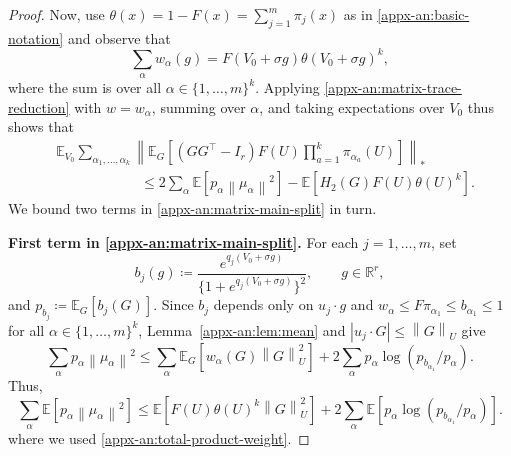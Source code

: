 \documentclass[11pt,letterpaper]{article}
\theoremstyle{remark}
\newcommand{\E}{\mathbb E}
\newcommand{\R}{\mathbb R}
\newcommand{\norm}[1]{\left\lVert#1\right\rVert}
\begin{document}
\begin{proof}
Now, use $\theta(x) = 1 - F(x) = \sum_{j=1}^m \pi_j(x)$ as in \eqref{appx-an:basic-notation} and observe that
\begin{equation}\label{appx-an:total-product-weight}
 \sum_\alpha w_\alpha(g)=F(V_0+\sigma g)\theta(V_0+\sigma g)^k,
\end{equation}
where the sum is over all $\alpha\in\{1,\dots,m\}^k$. Applying \eqref{appx-an:matrix-trace-reduction} with $w = w_{\alpha}$, summing over $\alpha$, and taking expectations over $V_0$ thus shows that
\begin{align}
& \E_{V_0}\sum_{\alpha_1,\ldots,\alpha_k}
 \left\|\E_G\left[(GG^\top-I_r)F(U)
              \prod_{a=1}^k\pi_{\alpha_a}(U)\right]\right\|_* \nonumber\\
& \qquad\qquad\qquad \le  2\sum_\alpha \E[p_\alpha\norm{\mu_\alpha}^2]
- \E[H_2(G)F(U)\theta(U)^k]. \label{appx-an:matrix-main-split}
\end{align}
We bound two terms in \eqref{appx-an:matrix-main-split} in turn.

{\bf First term in \eqref{appx-an:matrix-main-split}.} For each $j=1,\dots, m$, set
\[
 b_j(g)\coloneqq
 \frac{e^{q_j(V_0+\sigma g)}}
 {\{1+e^{q_j(V_0+\sigma g)}\}^2},
 \qquad g\in\R^r,
 \]
 and \(p_{b_j}\coloneqq\E_G[b_j(G)]\).
Since $b_j$ depends only on $u_j\cdot g$ and
$w_\alpha\le F\pi_{\alpha_1}\le b_{\alpha_1}\leq 1$ for all $\alpha\in\{1,\dots, m\}^k$,
Lemma~\ref{appx-an:lem:mean} and
$|u_j\cdot G|\le\norm G_U$ give
\[
 \sum_\alpha p_\alpha\norm{\mu_\alpha}^2
 \le \sum_{\alpha}\E_G[w_{\alpha}(G)\norm G_U^2]
 +2\sum_\alpha p_\alpha
 \log(p_{b_{\alpha_1}}/p_\alpha).
\] 
Thus,
\begin{equation}
\sum_\alpha \E[p_\alpha\norm{\mu_\alpha}^2]
 \le \E[F(U)\theta(U)^k\norm G_U^2]
 +2\sum_\alpha \E[p_\alpha
 \log(p_{b_{\alpha_1}}/p_\alpha)].
 \label{appx-an:entropy-sum}
\end{equation}
where we used \eqref{appx-an:total-product-weight}. 


\end{proof}
\end{document}
